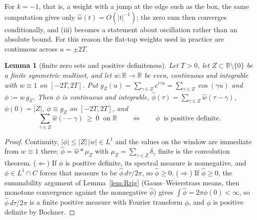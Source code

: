 \documentclass[11pt]{amsart}
\newtheorem{lemma}[theorem]{Lemma}
\theoremstyle{definition}
\theoremstyle{remark}
\newcommand{\R}{\mathbb R}
\newcommand{\wh}{\widehat w}
\begin{document}
For $k=-1$, that is, a weight with a jump at the edge such as the box, the same computation gives
only $\wh(t)=O(|t|^{-1})$; the zero sum then converges conditionally, and (iii) becomes a statement
about oscillation rather than an absolute bound. For this reason the flat-top weights used in
practice are continuous across $u=\pm2T$.

\begin{lemma}[finite zero sets and positive definiteness]\label{lem:fdict}
Let $T>0$, let $Z\subset\R\setminus\{0\}$ be a finite symmetric multiset, and let $w:\R\to\R$ be
even, continuous and integrable with $w\equiv1$ on $[-2T,2T]$. Put
$g_Z(u)=\sum_{\gamma\in Z}e^{i\gamma u}=\sum_{\gamma\in Z}\cos(\gamma u)$ and $\phi:=w\,g_Z$. Then
$\phi$ is continuous and integrable, $\widehat\phi(\tau)=\sum_{\gamma\in Z}\wh(\tau-\gamma)$,
$\phi(0)=|Z|$, $\phi\equiv g_Z$ on $[-2T,2T]$, and
\[
\sum_{\gamma\in Z}\wh(\cdot-\gamma)\ \ge\ 0\ \text{ on }\R
\qquad\Longleftrightarrow\qquad
\phi\ \text{ is positive definite.}
\]
\end{lemma}
\begin{proof}
Continuity, $|\phi|\le|Z|\,|w|\in L^1$ and the values on the window are immediate from $w\equiv1$
there; $\widehat\phi=\wh*\mu_Z$ with $\mu_Z=\sum_{\gamma\in Z}\delta_\gamma$ finite is the
convolution theorem. ($\Leftarrow$) If $\phi$ is positive definite, its spectral measure is
nonnegative, and $\phi\in L^1\cap C$ forces that measure to be $\widehat\phi\,d\tau/2\pi$, so
$\widehat\phi\ge0$. ($\Rightarrow$) If $\widehat\phi\ge0$, the summability argument of
Lemma~\ref{lem:Rrig} (Gauss--Weierstrass means, then monotone convergence against the nonnegative
$\widehat\phi$) gives $\int\widehat\phi=2\pi\phi(0)<\infty$, so $\widehat\phi\,d\tau/2\pi$ is a
finite positive measure with Fourier transform $\phi$, and $\phi$ is positive definite by Bochner.
\end{proof}
\end{document}

